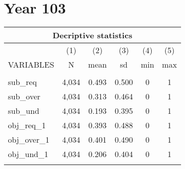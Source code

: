 \documentclass[]{article}
\begin{document}
\section*{Year 103}

\begin{tabular}{lccccc}
\multicolumn{6}{c}{Decriptive statistics} \\ \hline
 & (1) & (2) & (3) & (4) & (5) \\
VARIABLES & N & mean & sd & min & max \\ \hline
 &  &  &  &  &  \\
sub\_req & 4,034 & 0.493 & 0.500 & 0 & 1 \\
sub\_over & 4,034 & 0.313 & 0.464 & 0 & 1 \\
sub\_und & 4,034 & 0.193 & 0.395 & 0 & 1 \\
obj\_req\_1 & 4,034 & 0.393 & 0.488 & 0 & 1 \\
obj\_over\_1 & 4,034 & 0.401 & 0.490 & 0 & 1 \\
obj\_und\_1 & 4,034 & 0.206 & 0.404 & 0 & 1 \\
 &  &  &  &  &  \\ \hline
\end{tabular}
\end{document}

